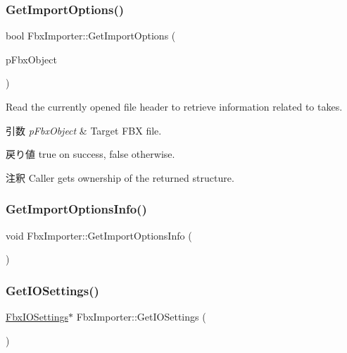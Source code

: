 \subsubsection{\texorpdfstring{Get\+Import\+Options()}{GetImportOptions()}\hspace{0.1cm}{\footnotesize\ttfamily [2/2]}}
{\footnotesize\ttfamily bool Fbx\+Importer\+::\+Get\+Import\+Options (\begin{DoxyParamCaption}\item[{\hyperlink{class_fbx_i_o}{Fbx\+IO} $\ast$}]{p\+Fbx\+Object }\end{DoxyParamCaption})}

Read the currently opened file header to retrieve information related to takes. 
\begin{DoxyParams}{引数}
{\em p\+Fbx\+Object} & Target F\+BX file. \\
\hline
\end{DoxyParams}
\begin{DoxyReturn}{戻り値}
{\ttfamily true} on success, {\ttfamily false} otherwise. 
\end{DoxyReturn}
\begin{DoxyRemark}{注釈}
Caller gets ownership of the returned structure. 
\end{DoxyRemark}
\mbox{\label{class_fbx_importer_a2d4879dada04a1ad2e41617de6538d2e}} 
\subsubsection{\texorpdfstring{Get\+Import\+Options\+Info()}{GetImportOptionsInfo()}}
{\footnotesize\ttfamily void Fbx\+Importer\+::\+Get\+Import\+Options\+Info (\begin{DoxyParamCaption}{ }\end{DoxyParamCaption})\hspace{0.3cm}{\ttfamily [protected]}}

\mbox{\label{class_fbx_importer_a864398459eef6683640812b9b82f92c9}} 
\subsubsection{\texorpdfstring{Get\+I\+O\+Settings()}{GetIOSettings()}}
{\footnotesize\ttfamily \hyperlink{class_fbx_i_o_settings}{Fbx\+I\+O\+Settings}$\ast$ Fbx\+Importer\+::\+Get\+I\+O\+Settings (\begin{DoxyParamCaption}{ }\end{DoxyParamCaption})}

